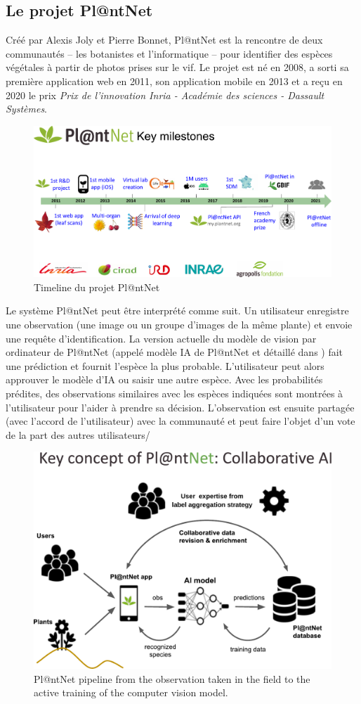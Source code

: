 \subsection{Le projet Pl@ntNet}
Créé par Alexis Joly et Pierre Bonnet, Pl@ntNet \citep{plantet} est la rencontre de deux communautés -- les botanistes et l'informatique -- pour identifier des espèces végétales à partir de photos prises sur le vif.
Le projet est né en 2008, a sorti sa première application web en 2011, son application mobile en 2013 et a reçu en 2020 le prix \emph{Prix de l'innovation Inria - Académie des sciences - Dassault Systèmes}.
\begin{figure}[tbh]
    \centering
    \includegraphics[width=.8\textwidth, clip, trim={0cm 0cm 0cm 2.5cm}]{chapters/images/Pl@ntNet-overview-Janv-2022.pdf}
    \caption{Timeline du projet Pl@ntNet}
    \label{fig:timeline-plantnet}
\end{figure}

Le système Pl@ntNet peut être interprété comme suit. Un utilisateur enregistre une observation (une image ou un groupe d'images de la même plante) et envoie une requête d'identification.
La version actuelle du modèle de vision par ordinateur de Pl@ntNet (appelé modèle IA de Pl@ntNet et détaillé dans ) fait une prédiction et fournit l'espèce la plus probable.
L'utilisateur peut alors approuver le modèle d'IA ou saisir une autre espèce.
Avec les probabilités prédites, des observations similaires avec les espèces indiquées sont montrées à l'utilisateur pour l'aider à prendre sa décision.
L'observation est ensuite partagée (avec l'accord de l'utilisateur) avec la communauté et peut faire l'objet d'un vote de la part des autres utilisateurs/

\begin{figure}[htb]
    \centering
    \includegraphics[width=.65\textwidth, clip, trim={0cm 0cm 0cm 2cm}]{chapters/images/cooperative learning Pl@ntNet schema.pdf}
    \caption{Pl@ntNet pipeline from the observation taken in the field to the active training of the computer vision model.}
\end{figure}

